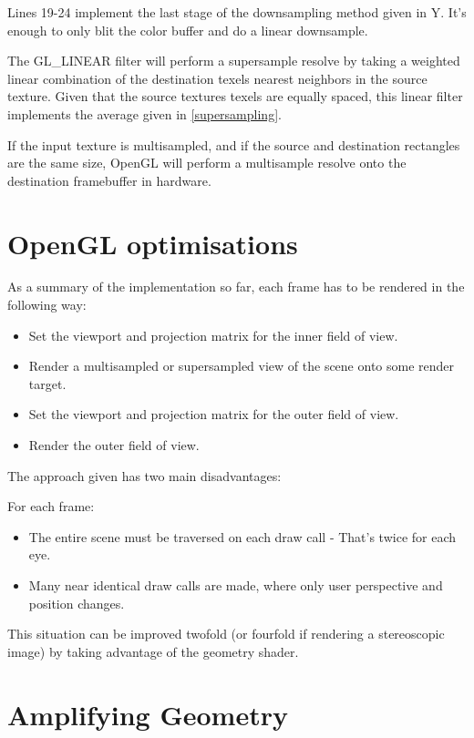 \documentclass[12pt,a4paper,twoside,openright]{report}
\begin{document}
Lines 19-24 implement the last stage of the downsampling method given in Y. It's enough to only blit the color buffer and do a linear downsample. 

The GL\_LINEAR filter will perform a supersample resolve by taking a weighted linear combination of the destination texels nearest neighbors in the source texture. Given that the source textures texels are equally spaced, this linear filter implements the average given in \ref{supersampling}.

If the input texture is multisampled, and if the source and destination rectangles are the same size, OpenGL will perform a multisample resolve onto the destination framebuffer in hardware.

\section{OpenGL optimisations}

As a summary of the implementation so far, each frame has to be rendered in the following way:

\begin{itemize}
  \item Set the viewport and projection matrix for the inner field of view.
  \item Render a multisampled or supersampled view of the scene onto some render target.
  \item Set the viewport and projection matrix for the outer field of view.
  \item Render the outer field of view.
\end{itemize}
The approach given has two main disadvantages:

For each frame:
\begin{itemize}
  \item The entire scene must be traversed on each draw call - That's twice for each eye.
  \item Many near identical draw calls are made, where only user perspective and position changes.
\end{itemize}

This situation can be improved twofold (or fourfold if rendering a stereoscopic image) by taking advantage of the geometry shader.

\section{Amplifying Geometry}
\end{document}
